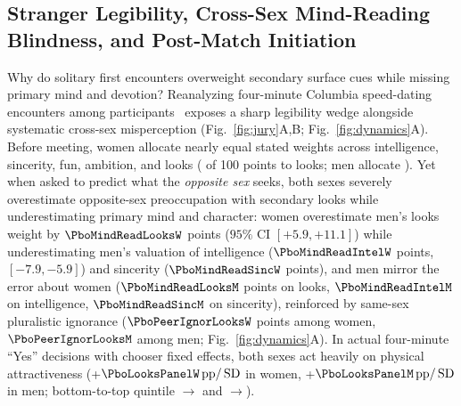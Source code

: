\subsection{Stranger Legibility, Cross-Sex Mind-Reading Blindness, and Post-Match Initiation}
Why do solitary first encounters overweight secondary surface cues while missing primary mind and devotion? Reanalyzing \SdRows{} four-minute Columbia speed-dating encounters among \SdN{} participants~\cite{fisman2006} exposes a sharp legibility wedge alongside systematic cross-sex misperception (Fig.~\ref{fig:jury}A,B; Fig.~\ref{fig:dynamics}A). Before meeting, women allocate nearly equal stated weights across intelligence, sincerity, fun, ambition, and looks (\PboLooksStatedW{} of 100 points to looks; men allocate \PboLooksStatedM). Yet when asked to predict what the \emph{opposite sex} seeks, both sexes severely overestimate opposite-sex preoccupation with secondary looks while underestimating primary mind and character: women overestimate men's looks weight by $\PboMindReadLooksW$ points ($95\%$ CI $[+5.9,+11.1]$) while underestimating men's valuation of intelligence ($\PboMindReadIntelW$ points, $[-7.9,-5.9]$) and sincerity ($\PboMindReadSincW$ points), and men mirror the error about women ($\PboMindReadLooksM$ points on looks, $\PboMindReadIntelM$ on intelligence, $\PboMindReadSincM$ on sincerity), reinforced by same-sex pluralistic ignorance ($\PboPeerIgnorLooksW$ points among women, $\PboPeerIgnorLooksM$ among men; Fig.~\ref{fig:dynamics}A). In actual four-minute ``Yes'' decisions with chooser fixed effects, both sexes act heavily on physical attractiveness (+$\PboLooksPanelW\,\mathrm{pp}/\SD$ in women, +$\PboLooksPanelM\,\mathrm{pp}/\SD$ in men; bottom-to-top quintile \PboYesLowW{}$\to$\PboYesHighW{} and \PboYesLowM{}$\to$\PboYesHighM{}).

